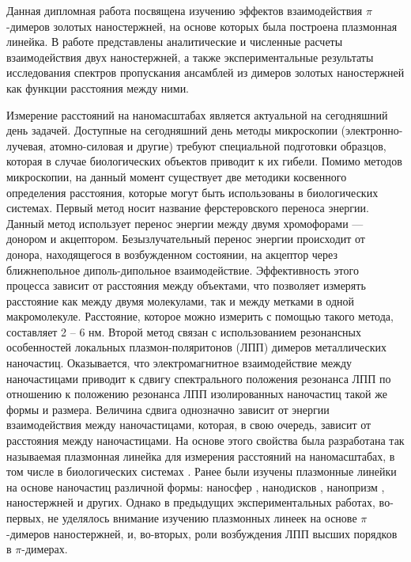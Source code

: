 
Данная дипломная работа посвящена изучению эффектов взаимодействия $ \pi $-димеров золотых наностержней, на основе которых была построена плазмонная линейка. В работе представлены аналитические и численные расчеты взаимодействия двух наностержней, а также экспериментальные результаты исследования спектров пропускания ансамблей из димеров золотых наностержней как функции расстояния между ними.

Измерение расстояний на наномасштабах является актуальной на сегодняшний день задачей. Доступные на сегодняшний день методы микроскопии (электронно-лучевая, атомно-силовая и другие) требуют специальной подготовки образцов, которая в случае биологических объектов приводит к их гибели. Помимо методов микроскопии, на данный момент существует две методики косвенного определения расстояния, которые могут быть использованы в биологических системах. Первый метод носит название ферстеровского переноса энергии. Данный метод использует перенос энергии между двумя хромофорами --- донором и акцептором. Безызлучательный перенос энергии происходит от донора, находящегося в возбужденном состоянии, на акцептор через ближнепольное диполь-дипольное взаимодействие. Эффективность этого процесса зависит от расстояния между объектами, что позволяет измерять расстояние как между двумя молекулами, так и между метками в одной макромолекуле. Расстояние, которое можно измерить с помощью такого метода, составляет 2 -- 6 нм. Второй метод связан с использованием резонансных особенностей локальных плазмон-поляритонов (ЛПП) димеров металлических наночастиц. Оказывается, что электромагнитное взаимодействие между наночастицами приводит к сдвигу спектрального положения резонанса ЛПП по отношению к положению резонанса ЛПП изолированных наночастиц такой же формы и размера. Величина сдвига однозначно зависит от энергии взаимодействия между наночастицами, которая, в свою очередь, зависит от расстояния между наночастицами. На основе этого свойства была разработана так называемая плазмонная линейка для измерения расстояний на наномасштабах, в том числе в биологических системах \cite{DNA}. Ранее были изучены плазмонные линейки на основе наночастиц различной формы: наносфер \cite{nanospheres}, нанодисков \cite{plasonrulereq}, нанопризм \cite{nanoprism}, наностержней \cite{nanorods} и других. Однако в предыдущих экспериментальных работах, во-первых, не уделялось внимание изучению плазмонных линеек на основе $ \pi $-димеров наностержней, и, во-вторых, роли возбуждения ЛПП высших порядков в $ \pi $-димерах.


